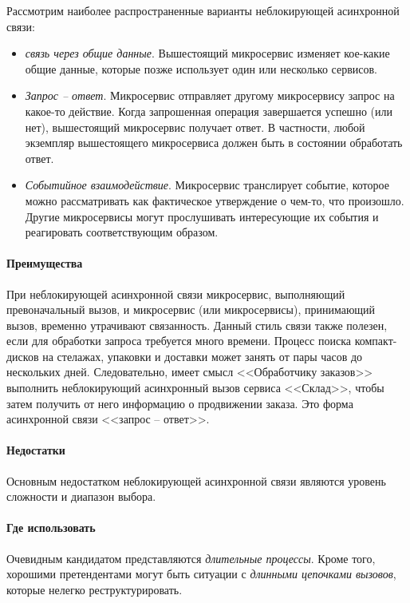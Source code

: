 \documentclass[%
	11pt,
	a4paper,
	utf8,
		]{article}
\begin{document}
Рассмотрим наиболее распространенные варианты неблокирующей асинхронной связи:
\begin{itemize}
	\item \emph{связь через общие данные}. Вышестоящий микросервис изменяет кое-какие общие данные, которые позже использует один или несколько сервисов.
	
	\item \emph{Запрос -- ответ}. Микросервис отправляет другому микросервису запрос на какое-то действие. Когда запрошенная операция завершается успешно (или нет), вышестоящий микросервис получает ответ. В частности, любой экземпляр вышестоящего микросервиса должен быть в состоянии обработать ответ.
	
	\item \emph{Событийное взаимодействие}. Микросервис транслирует событие, которое можно рассматривать как фактическое утверждение о чем-то, что произошло. Другие микросервисы могут прослушивать интересующие их события и реагировать соответствующим образом.
\end{itemize}

\paragraph{Преимущества}

При неблокирующей асинхронной связи микросервис, выполняющий превоначальный вызов, и микросервис (или микросервисы), принимающий вызов, временно утрачивают связанность. Данный стиль связи также полезен, если для обработки запроса требуется много времени. Процесс поиска компакт-дисков на стелажах, упаковки и доставки может занять от пары часов до нескольких дней. Следовательно, имеет смысл <<Обработчику заказов>> выполнить неблокирующий асинхронный вызов сервиса <<Склад>>, чтобы затем получить от него информацию о продвижении заказа. Это форма асинхронной связи <<запрос -- ответ>>.

\paragraph{Недостатки}

Основным недостатком неблокирующей асинхронной связи являются уровень сложности и диапазон выбора.

\paragraph{Где использовать}

Очевидным кандидатом представляются \emph{длительные процессы}. Кроме того, хорошими претендентами могут быть ситуации с \emph{длинными цепочками вызовов}, которые нелегко реструктурировать.
\end{document}

